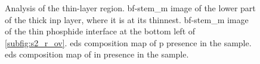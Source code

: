 \begin{figure}
{\begin{tikzpicture}
        \end{tikzpicture}
    }
    \caption{Analysis of the thin-layer region.  \acs{bf}-\acs{stem_m} image of the lower part of the thick \acs{inp} layer, where it is at its thinnest.  \acs{bf}-\acs{stem_m} image of the thin phosphide interface at the bottom left of \ref{subfig:s2_r_ov}.  \acs{eds} composition map of \acl{p} presence in the sample.  \acs{eds} composition map of \acl{in} presence in the sample.}
    \label{fig:s2_details}
\end{figure}

